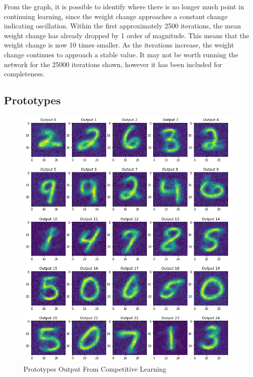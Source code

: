 \documentclass[11pt,journal,transmag,final]{IEEEtran}
\begin{document}
From the graph, it is possible to identify where there is no longer much point in continuing learning, since the weight change approaches a constant change indicating oscillation. Within the first approximately 2500 iterations, the mean weight change has already dropped by 1 order of magnitude. This means that the weight change is now 10 times smaller. As the iterations increase, the weight change continues to approach a stable value. It may not be worth running the network for the 25000 iterations shown, however it has been included for completeness.

\subsection{Prototypes}

\begin{figure}[!t]
    \begin{center}
        \includegraphics[width=\linewidth,keepaspectratio]{figures/nn-results.png}
        \caption{Prototypes Output From Competitive Learning}
        \label{fig:nn-prototypes}
    \end{center}
\end{figure}
\end{document}
